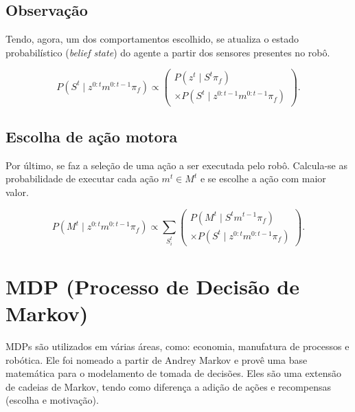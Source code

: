\subsection{Observação}

Tendo, agora, um dos comportamentos escolhido, se atualiza o estado probabilístico (\textit{belief state}) do agente a partir dos sensores presentes no robô.

\begin{equation}
    P \left( S^t \mid z^{0: t} m^{0: t-1} \pi_f \right) \propto 
        \left(
            \begin{array}{l}
                P \left( z^t \mid S^t \pi_f \right) \\
                \times P \left( S^t \mid z^{0: t-1} m^{0: t-1} \pi_f \right)
            \end{array}
        \right).
\end{equation}


\subsection{Escolha de ação motora}

Por último, se faz a seleção de uma ação a ser executada pelo robô. Calcula-se as probabilidade de executar cada ação $ m^t \in M^t $ e se escolhe a ação com maior valor.

\begin{equation}
    P \left( M^t \mid z^{0: t} m^{0: t-1} \pi_f \right) \propto \sum\limits_{S_i^t}
        \left(
            \begin{array}{l}
                P \left( M^t \mid S^t m^{t-1} \pi_f \right)\\
                \times P \left( S^t \mid z^{0: t} m^{0: t-1} \pi_f \right)
            \end{array}
        \right).
\end{equation}


\section{MDP (Processo de Decisão de Markov)} \label{section:MDP}

MDPs são utilizados em várias áreas, como: economia, manufatura de processos e robótica. Ele foi nomeado a partir de Andrey Markov e provê uma base matemática para o modelamento de tomada de decisões. Eles são uma extensão de cadeias de Markov, tendo como diferença a adição de ações e recompensas (escolha e motivação).

